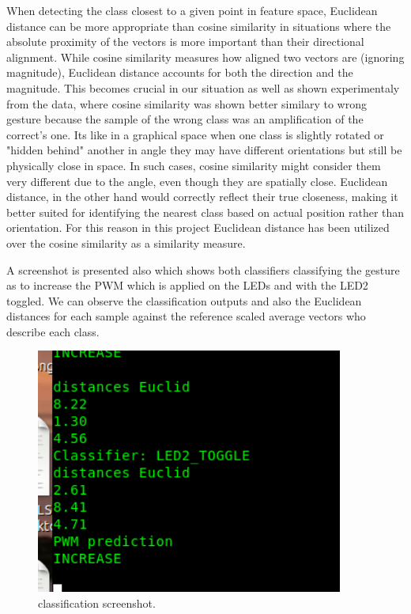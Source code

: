 \documentclass[a4paper,12pt]{article}
\begin{document}
	When detecting the class closest to a given point in feature space, 
	Euclidean distance can be more appropriate than cosine similarity in situations 
	where the absolute proximity of the vectors is more important than their directional alignment. 
	While cosine similarity measures how aligned two vectors are (ignoring magnitude), 
	Euclidean distance accounts for both the direction and the magnitude. 
	This becomes crucial in our situation as well as shown experimentaly from the data, 
	where cosine similarity was shown better similary to wrong gesture because the sample of 
	the wrong class was an amplification of the correct's one.
	Its like in a graphical space  when one class is slightly rotated or "hidden behind" 
	another in angle they may have different orientations but still be physically close in space. 
	In such cases, cosine similarity might consider them very different due to the angle, 
	even though they are spatially close. 
	Euclidean distance, in the other hand would correctly reflect their true closeness, 
	making it better suited for identifying the nearest class based on actual position rather than orientation.	
	For this reason in this project Euclidean distance has been utilized over the cosine similarity as a similarity measure.


	A screenshot is presented also which shows both classifiers classifying the gesture as to increase the PWM which is applied on
	the LEDs and with the LED2 toggled. We can observe the classification outputs and also the Euclidean distances for each sample
	against the reference scaled average vectors who describe each class.

	\begin{figure}[H]
			\centering
			\includegraphics[width=0.9\textwidth]{classification.png}
			\caption{classification screenshot.}
			\label{fig1:}
		\end{figure}		
\end{document}
